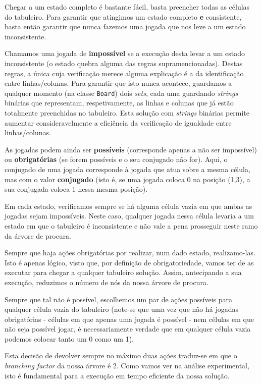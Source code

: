 \documentclass[12pt,a4paper]{article}
\begin{document}
  Chegar a um estado completo é bastante fácil, basta preencher todas as células do tabuleiro.
  Para garantir que atingimos um estado completo \textbf{e} consistente, basta então garantir que nunca fazemos uma jogada que nos leve a um estado inconsistente.

  Chamamos uma jogada de \textbf{impossível} se a execução desta levar a um estado inconsistente (o estado quebra alguma das regras supramencionadas).
  Destas regras, a única cuja verificação merece alguma explicação é a da identificação entre linhas/colunas.
  Para garantir que isto nunca acontece, guardamos a qualquer momento (na classe \texttt{Board}) dois \textit{sets}, cada uma guardando \textit{strings} binárias que representam, respetivamente, as linhas e colunas que já estão totalmente preenchidas no tabuleiro.
  Esta solução com \textit{strings} binárias permite aumentar consideravelmente a eficiência da verificação de igualdade entre linhas/colunas. 

  As jogadas podem ainda ser \textbf{possíveis} (corresponde apenas a não ser impossível) ou \textbf{obrigatórias} (se forem possíveis e o seu conjugado não for).
  Aqui, o conjugado de uma jogada corresponde à jogada que atua sobre a mesma célula, mas com o valor \textbf{conjugado} (isto é, se uma jogada coloca 0 na posição (1,3), a sua conjugada coloca 1 nessa mesma posição).

  Em cada estado, verificamos sempre se há alguma célula vazia em que ambas as jogadas sejam impossíveis.
  Neste caso, qualquer jogada nessa célula levaria a um estado em que o tabuleiro é inconsistente e não vale a pena prosseguir neste ramo da árvore de procura.

  Sempre que haja ações obrigatórias por realizar, num dado estado, realizamo-las. 
  Isto é apenas lógico, visto que, por definição de obrigatoriedade, vamos ter de as executar para chegar a qualquer tabuleiro solução.
  Assim, antecipando a sua execução, reduzimos o número de nós da nossa árvore de procura.

  Sempre que tal não é possível, escolhemos um par de ações possíveis para qualquer célula vazia do tabuleiro (note-se que uma vez que não há jogadas obrigatórias - células em que apenas uma jogada é possível - nem células em que não seja possível jogar, é necessariamente verdade que em qualquer célula vazia podemos colocar tanto um 0 como um 1).

  Esta decisão de devolver sempre no máximo duas ações traduz-se em que o \textit{branching factor} da nossa árvore é 2.
  Como vamos ver na análise experimental, isto é fundamental para a execução em tempo eficiente da nossa solução.
\end{document}
